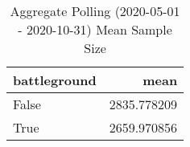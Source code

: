 \begin{table}
\centering
\caption{Aggregate Polling (2020-05-01 - 2020-10-31) Mean Sample Size}
\begin{tabular}{lr}
\toprule
 battleground &         mean \\
\midrule
        False &  2835.778209 \\
         True &  2659.970856 \\
\bottomrule
\end{tabular}
\end{table}
